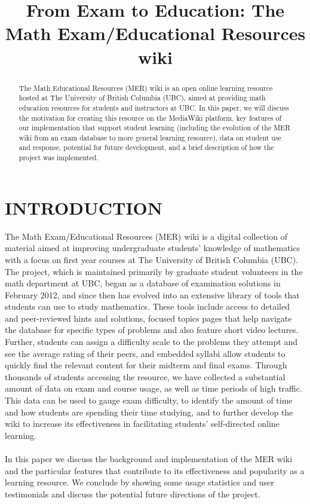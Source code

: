 \documentclass{primus}
\title{From Exam to Education: The Math Exam/Educational Resources wiki
}
\begin{document}
\makePtitle

\begin{abstract}
The Math Educational Resources (MER) wiki is an open online learning resource hosted at The University of British Columbia (UBC), aimed at providing math education resources for students and instructors at UBC.  In this paper, we will discuss the motivation for creating this resource on the MediaWiki platform, key features of our implementation that support student learning (including the evolution of the MER wiki from an exam database to more general learning resource), data on student use and response, potential for future development, and a brief description of how the project was implemented.
\end{abstract}

\listkeywords

\section{INTRODUCTION}\label{sec:Introduction}

The Math Exam/Educational Resources (MER) wiki is a digital collection of material aimed at improving undergraduate students’ knowledge of mathematics with a focus on first year courses at The University of British Columbia (UBC). The project, which is  maintained primarily by graduate student volunteers in the math department at UBC, began as a database of examination solutions in February 2012, and since then has evolved into an extensive library of tools that students can use to study mathematics.  These tools include access to detailed and peer-reviewed hints and solutions, focused topics pages that help navigate the database for specific types of problems and also feature short video lectures. Further, students can assign a difficulty scale to the problems they attempt and see the average rating of their peers, and embedded syllabi allow students to quickly find the relevant content for their midterm and final exams. Through thousands of students accessing the resource, we have collected a substantial amount of data on exam and course usage, as well as time periods of high traffic. This data can be used to gauge exam difficulty, to identify the amount of time and how students are spending their time studying, and to further develop the wiki to increase its effectiveness in facilitating students’ self-directed online learning.
\\\\
\noindent{}In this paper we discuss the background and implementation of the MER wiki and the particular features that contribute to its effectiveness and popularity as a learning resource.  We conclude by showing some usage statistics and user testimonials and discuss the potential future directions of the project.
\end{document}
